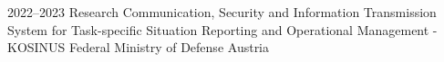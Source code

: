 \cventry
{2022--2023}
{Research}
{Communication, Security and Information Transmission System for Task-specific Situation Reporting and Operational Management - KOSINUS}
{Federal Ministry of Defense}
{Austria}
{
}
